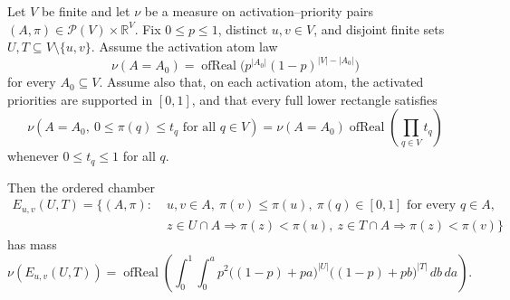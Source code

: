 \begin{helper}
Let \(V\) be finite and let \(\nu\) be a measure on activation--priority
pairs \((A,\pi)\in\mathcal P(V)\times\mathbb R^V\).  Fix \(0\le p\le1\),
distinct \(u,v\in V\), and disjoint finite sets
\(U,T\subseteq V\setminus\{u,v\}\).  Assume the activation atom law
\[
\nu(A=A_0)=\operatorname{ofReal}\bigl(p^{|A_0|}(1-p)^{|V|-|A_0|}\bigr)
\]
for every \(A_0\subseteq V\).  Assume also that, on each activation atom, the
activated priorities are supported in \([0,1]\), and that every full lower
rectangle satisfies
\[
\nu(A=A_0,\ 0\le \pi(q)\le t_q\text{ for all }q\in V)
=\nu(A=A_0)\operatorname{ofReal}\!\left(\prod_{q\in V}t_q\right)
\]
whenever \(0\le t_q\le1\) for all \(q\).

Then the ordered chamber
\[
\begin{aligned}
E_{u,v}(U,T)=\{(A,\pi):\;&u,v\in A,\ \pi(v)\le\pi(u),\
\pi(q)\in[0,1]\text{ for every }q\in A,\\
& z\in U\cap A\Rightarrow \pi(z)<\pi(u),\
z\in T\cap A\Rightarrow \pi(z)<\pi(v)\}
\end{aligned}
\]
has mass
\[
\nu(E_{u,v}(U,T))
=\operatorname{ofReal}\!\left(
\int_0^1\int_0^a
p^2\bigl((1-p)+pa\bigr)^{|U|}
\bigl((1-p)+pb\bigr)^{|T|}\,db\,da\right).
\]
\end{helper}
